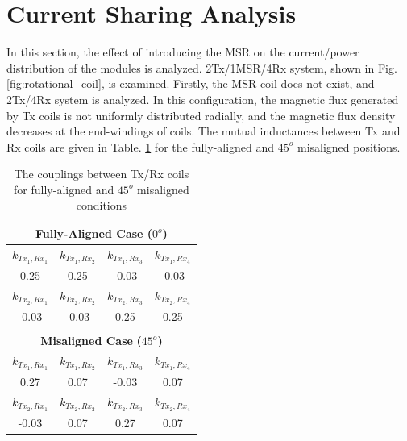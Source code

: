 \documentclass[journal]{IEEEtran}
\begin{document}
\section{Current Sharing Analysis}
In this section, the effect of introducing the MSR on the current/power distribution of the modules is analyzed. 2Tx/1MSR/4Rx system, shown in Fig. \ref{fig:rotational_coil}, is examined. 
Firstly, the MSR coil does not exist, and 2Tx/4Rx system is analyzed.
In this configuration, the magnetic flux generated by Tx coils is not uniformly distributed radially, and the magnetic flux density decreases at the end-windings of coils.
The mutual inductances between Tx and Rx coils are given in Table.  \ref{tab:aligned-misaligned} for the fully-aligned and $45^o$ misaligned positions.
\begin{table}[h]
\caption{The couplings between Tx/Rx coils for fully-aligned and $45^o$ misaligned conditions} 
\centering
\begin{tabular}{cccc}
\multicolumn{4}{c}{\textbf{Fully-Aligned Case ($0^o$)}} \\ \hline \hline
$k_{Tx_1,Rx_1}$  & $k_{Tx_1,Rx_2}$  & $k_{Tx_1,Rx_3}$  & $k_{Tx_1,Rx_4}$                                                   \\ 
0.25    & 0.25  & -0.03 & -0.03      \\ \hline                                                               
$k_{Tx_2,Rx_1}$  & $k_{Tx_2,Rx_2}$  & $k_{Tx_2,Rx_3}$  & $k_{Tx_2,Rx_4}$                                                   \\ 
-0.03    & -0.03  & 0.25 & 0.25      \\ 
\\

\multicolumn{4}{c}{\textbf{Misaligned Case} \textbf{($45^o$)}} \\ \hline \hline
$k_{Tx_1,Rx_1}$  & $k_{Tx_1,Rx_2}$  & $k_{Tx_1,Rx_3}$  & $k_{Tx_1,Rx_4}$                                                   \\ 
0.27    & 0.07  & -0.03 & 0.07      \\ \hline                                                               
$k_{Tx_2,Rx_1}$  & $k_{Tx_2,Rx_2}$  & $k_{Tx_2,Rx_3}$  & $k_{Tx_2,Rx_4}$                                                   \\ 
-0.03   & 0.07  & 0.27 & 0.07                                    
\end{tabular}
\label{tab:aligned-misaligned}
\end{table}
\end{document}
